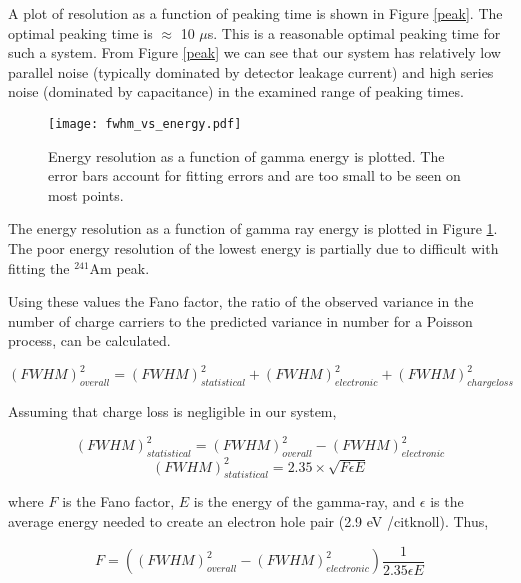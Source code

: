 A plot of resolution as a function of peaking time is shown in Figure \ref{peak}. The optimal peaking time is $\approx $ 10 $\mu$s. This is a reasonable optimal peaking time for such a system. From Figure \ref{peak} we can see that our system has relatively low parallel noise (typically dominated by detector leakage current) and high series noise (dominated by capacitance) in the examined range of peaking times.

\begin{figure}
\begin{centering}
\texttt{[image: fwhm\_vs\_energy.pdf]}
\caption{Energy resolution as a function of gamma energy is plotted. The error bars account for fitting errors and are too small to be seen on most points.}
\label{eres}
\end{centering}
\end{figure}

The energy resolution as a function of gamma ray energy is plotted in Figure \ref{eres}. The poor energy resolution of the lowest energy is partially due to difficult with fitting the ${}^{241}$Am peak.

Using these values the Fano factor, the ratio of the observed variance in the number of charge carriers to the predicted variance in number for a Poisson process, can be calculated.

\begin{equation}
(FWHM)^{2}_{overall} = (FWHM)^{2}_{statistical}+ (FWHM)^{2}_{electronic} + (FWHM)^{2}_{chargeloss}
\end{equation}
\vspace{5mm}

Assuming that charge loss is negligible in our system,

\vspace{5mm}
\begin{equation}
(FWHM)^{2}_{statistical} = (FWHM)^{2}_{overall} - (FWHM)^{2}_{electronic}
\end{equation}
\begin{equation}
(FWHM)^{2}_{statistical} = 2.35 \times \sqrt{F \epsilon E}
\end{equation}
\vspace{5mm}

where $F$ is the Fano factor, $E$ is the energy of the gamma-ray, and $\epsilon$ is the average energy needed to create an 
electron hole pair (2.9 eV /cit{knoll}). Thus,

\vspace{5mm}
\begin{equation}
F = ((FWHM)^{2}_{overall} - (FWHM)^{2}_{electronic}) \frac{1}{2.35 \epsilon E}
\end{equation}
\vspace{5mm}

